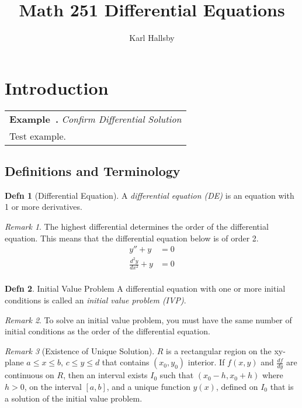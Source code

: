\documentclass[10pt,letterpaper,final,twoside,notitlepage]{article}
\author{Karl Hallsby}
\title{Math 251 Differential Equations}
\theoremstyle{plain}
\theoremstyle{definition}
\newtheorem{definition}{Defn}
\theoremstyle{remark}
\newtheorem{remark}{Remark}[definition]
\newcounter{example}[section]
\newenvironment{example}[1] %
	{\refstepcounter{example} \begin{center}\begin{tabular}{|p{0.9\textwidth}|} \hline \textbf{Example~\theexample.} \textit{#1}  \\ }
	{\\ \hline \end{tabular} \end{center}}
\begin{document}
\section{Introduction} \label{sec:Introduction}
	\begin{example}{Confirm Differential Solution}
		Test example.
	\end{example}
	\subsection{Definitions and Terminology} \label{subsec:Definitions and Terminology}
		\begin{definition}[Differential Equation] \label{def:Differential Equation}
			A \emph{differential equation (DE)} is an equation with 1 or more derivatives.
			\begin{remark}
				The highest differential determines the order of the differential equation.
				This means that the differential equation below is of order 2.
				\begin{align*} 
					y'' + y &= 0 \\
					\frac{d^{2}y}{dx^{2}} + y &= 0 \\
				\end{align*} 
			\end{remark}
		\end{definition}
		\begin{definition}{Initial Value Problem} \label{def:Initial Value Problem}
			A differential equation with one or more initial conditions is called an \emph{initial value problem (IVP)}.
			\begin{remark}
				To solve an initial value problem, you must have the same number of initial conditions as the order of the differential equation.
			\end{remark}
			\begin{remark}[Existence of Unique Solution]
				$R$ is a rectangular region on the xy-plane $a \leq x \leq b$, $c \leq y \leq d$ that contains $\left( x_{0}, y_{0} \right)$ interior.
				If $f \left( x,y \right)$ and $\frac{df}{dy}$ are continuous on $R$, then an interval exists $I_{0}$ such that $\left( x_{0}-h, x_{0}+h \right)$ where $h>0$, on the interval $\left[ a,b \right]$, and a unique function $y \left( x \right)$, defined on $I_{0}$ that is a solution of the initial value problem.
			\end{remark}
		\end{definition}
	
\end{document}
